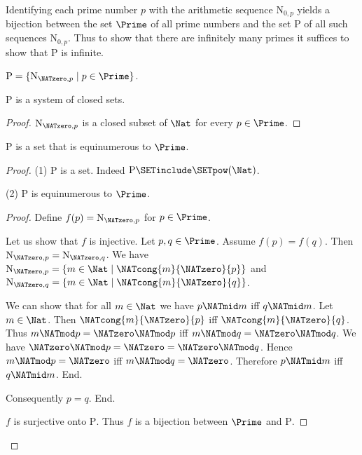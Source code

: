 \documentclass{article}
\newcommand{\N}{\mathrm{N}}
\newcommand{\Ps}{\mathrm{P}}
\begin{document}
  Identifying each prime number $p$ with the arithmetic sequence $\N_{0, p}$
  yields a bijection between the set $\Prime$ of all prime numbers and the set
  $\Ps$ of all such sequences $\N_{0, p}$.
  Thus to show that there are infinitely many primes it suffices to show that
  $\Ps$ is infinite.

  \begin{forthel}
    \begin{definition}
      $\Ps = \{ \N_{\NATzero, p} \mid p \in \Prime \}$.
    \end{definition}

    \begin{lemma}
      $\Ps$ is a system of closed sets.
    \end{lemma}
    \begin{proof}
      $\N_{\NATzero, p}$ is a closed subset of $\Nat$ for every $p \in \Prime$.
    \end{proof}

    \begin{lemma}
      $\Ps$ is a set that is equinumerous to $\Prime$.
    \end{lemma}
    \begin{proof}
      (1) $\Ps$ is a set.
      Indeed $\Ps \SETinclude \SETpow(\Nat)$.

      (2) $\Ps$ is equinumerous to $\Prime$.
      \begin{proof}
        Define $f(p) = \N_{\NATzero,p}$ for $p \in \Prime$.

        Let us show that $f$ is injective.
          Let $p, q \in \Prime$.
          Assume $f(p) = f(q)$.
          Then $\N_{\NATzero, p} = \N_{\NATzero, q}$.
          We have $\N_{\NATzero, p} = \{ m \in \Nat \mid \NATcong{m}{\NATzero}{p} \}$ and
          $\N_{\NATzero, q} = \{ m \in \Nat \mid \NATcong{m}{\NATzero}{q} \}$.

          We can show that for all $m \in \Nat$ we have $p \NATmid m$ iff $q \NATmid m$.
            Let $m \in \Nat$.
            Then $\NATcong{m}{\NATzero}{p}$ iff $\NATcong{m}{\NATzero}{q}$.
            Thus $m \NATmod p = \NATzero \NATmod p$ iff $m \NATmod q = \NATzero \NATmod q$.
            We have $\NATzero \NATmod p = \NATzero = \NATzero \NATmod q$.
            Hence $m \NATmod p = \NATzero$ iff $m \NATmod q = \NATzero$.
            Therefore $p \NATmid m$ iff $q \NATmid m$.
          End.

          Consequently $p = q$.
        End.

        $f$ is surjective onto $\Ps$.
        Thus $f$ is a bijection between $\Prime$ and $\Ps$.
      \end{proof}
    \end{proof}


\end{forthel}
\end{document}

